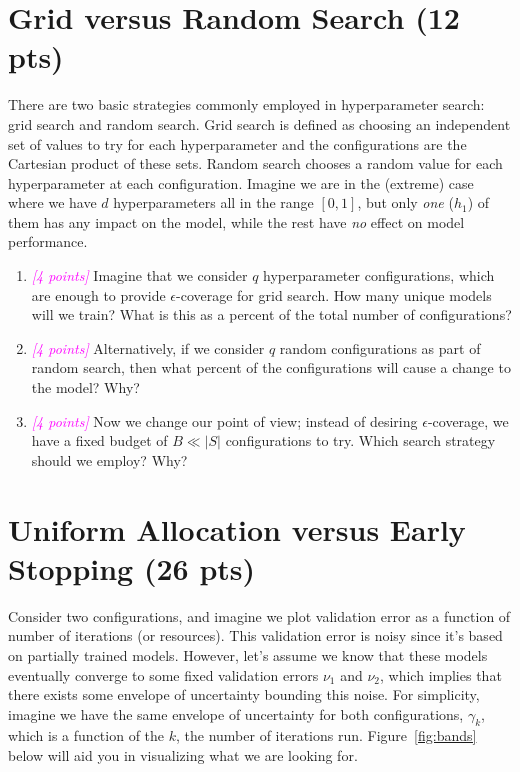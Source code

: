 \documentclass{exam}
\newcommand{\grade}[1]{\small\textcolor{magenta}{\emph{[#1 points]}} \normalsize}
\begin{document}
\section{Grid versus Random Search (\Large{12} pts)}
There are two basic strategies commonly employed in hyperparameter search: grid search and random search. Grid search is defined as choosing an independent set of values to try for each hyperparameter and the configurations are the Cartesian product of these sets. Random search chooses a random value for each hyperparameter at each configuration. Imagine we are in the (extreme) case where we have $d$ hyperparameters all in the range $[0,1]$, but only \emph{one} ($h_1$) of them has any impact on the model, while the rest have \emph{no} effect on model performance. 
\begin{enumerate}[label=(\alph*)]
    \item \grade{4} Imagine that we consider $q$ hyperparameter configurations, which are enough to provide $\epsilon$-coverage for grid search. How many unique models will we train? What is this as a percent of the total number of configurations?
    
    \vspace{1.5in}
    \item \grade{4} Alternatively, if we consider $q$ random configurations as part of random search, then what percent of the configurations will cause a change to the model?  Why?
    
    \vspace{1.5in}
    \item \grade{4} Now we change our point of view; instead of desiring $\epsilon$-coverage, we have a fixed budget of $B \ll |S|$ configurations to try. Which search strategy should we employ? Why?
    
    
\end{enumerate}


\clearpage
\section{Uniform Allocation versus Early Stopping (\Large{26} pts)}

Consider two configurations, and imagine we plot validation error as a function of number of iterations (or resources).  This validation error is noisy since it's based on partially trained models. However, let's assume we know that these models eventually converge to some fixed validation errors $\nu_1$ and $\nu_2$, which implies that there exists some envelope of uncertainty bounding this noise. For simplicity, imagine we have the same envelope of uncertainty for both configurations, $\gamma_k$, which is a function of the $k$, the number of iterations run. Figure~\ref{fig:bands} below will aid you in visualizing what we are looking for.
\end{document}
